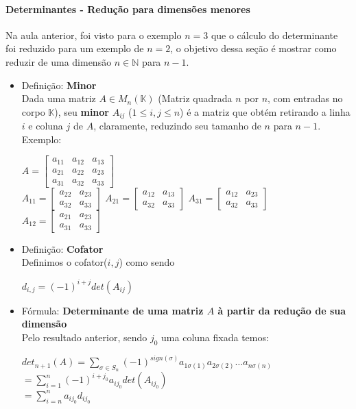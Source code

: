 \documentclass[12pt]{article}
\begin{document}
\paragraph{Determinantes - Redução para dimensões menores\\}
	Na aula anterior, foi visto para o exemplo $n = 3$ que o cálculo do determinante foi reduzido para um exemplo de $n = 2$, o objetivo dessa seção é mostrar como reduzir de uma dimensão $n \in \mathbb{N}$ para $n - 1$.
	\begin{itemize}
		\item Definição: \textbf{Minor}\\
		Dada uma matriz $A \in M_n(\mathbb{K})$ (Matriz quadrada $n$ por $n$, com entradas no corpo $\mathbb{K}$), seu \textbf{minor} $A_{ij}$ ($1 \leq i,j \leq n$) é a matriz que obtém retirando a linha $i$ e coluna $j$ de $A$, claramente, reduzindo seu tamanho de $n$ para $n-1$. Exemplo:
		\begin{center}
		$A = \begin{bmatrix}		
		a_{11} & a_{12} & a_{13} \\ a_{21} & a_{22} & a_{23} \\ a_{31} & a_{32} & a_{33}
		\end{bmatrix}$\\[10pt]
		$A_{11} = \begin{bmatrix} a_{22} & a_{23} \\ a_{32} & a_{33} \end{bmatrix}$ 
		$A_{21} = \begin{bmatrix} a_{12} & a_{13} \\ a_{32} & a_{33} \end{bmatrix}$ 
		$A_{31} = \begin{bmatrix} a_{12} & a_{23} \\ a_{32} & a_{33} \end{bmatrix}$ 
		$A_{12} = \begin{bmatrix} a_{21} & a_{23} \\ a_{31} & a_{33} \end{bmatrix}$
		\end{center}
		
		\item Definição: \textbf{Cofator}\\
		Definimos o cofator($i,j$) como sendo
		\begin{center}
			$d_{i,j} = (-1)^{i+j} det(A_{ij})	$
		\end{center}
		
		\item Fórmula: \textbf{Determinante de uma matriz $A$ à partir da redução de sua dimensão}\\
		Pelo resultado anterior, sendo $j_0$ uma coluna fixada temos:
		\begin{center}
			$det_{n+1}(A) = \sum\limits_{\sigma\in S_n} (-1)^{sign(\sigma)} a_{1\sigma(1)} a_{2\sigma(2)} \dots a_{n\sigma(n)}$\\
			$= \sum\limits_{i = 1}^n (-1)^{i+j_0} a_{ij_0} det(A_{ij_0})$\\
			$= \sum\limits_{i = n}^n a_{ij_0}d_{ij_0}$
		\end{center}
	\end{itemize}
	
\end{document}
